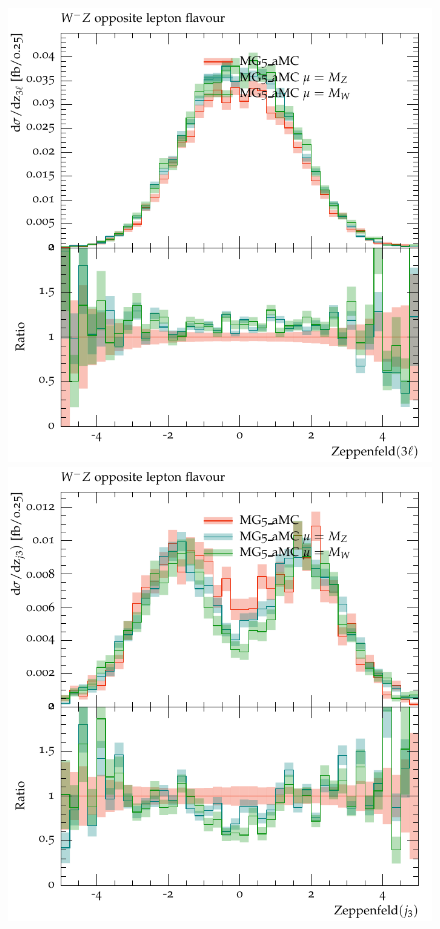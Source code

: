 \documentclass[11pt]{cernrep}
\begin{document}
\begin{figure}[htbp]
\begin{center}
   \includegraphics[scale=0.5]{figs/MG_WmZ_OF_zep3l}
   \includegraphics[scale=0.5]{figs/MG_WmZ_OF_zepj3}

\end{center}
\end{figure}
\end{document}
